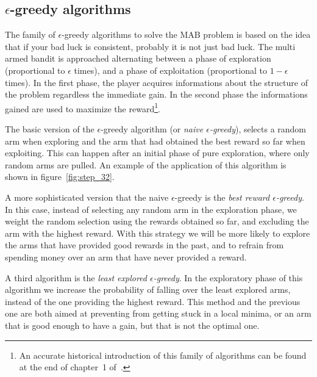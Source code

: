 \documentclass[]{scrartcl}
\theoremstyle{definition}
\begin{document}
\subsection*{$\epsilon$-greedy algorithms}

The family of $\epsilon$-greedy algorithms to solve the MAB problem is based on the idea that if your bad luck is consistent, probably it is not just bad luck. The multi armed bandit is approached alternating between a phase of exploration (proportional to $\epsilon$ times), and a phase of exploitation (proportional to $1 - \epsilon$ times). In the first phase, the player acquires informations about the structure of the problem regardless the immediate gain. In the second phase the informations gained are used to maximize the reward\footnote{
    An accurate historical introduction of this family of algorithms can be found at the end of chapter~1 of~\cite{sutton2018reinforcement}.
}.

The basic version of the $\epsilon$-greedy algorithm (or \emph{naive $\epsilon$-greedy}), selects a random arm when exploring and the arm that had obtained the best reward so far when exploiting. This can happen after an initial phase of pure exploration, where only random arms are pulled. An example of the application of this algorithm is shown in figure~\ref{fig:step_32}.

A more sophisticated version that the naive $\epsilon$-greedy is the \emph{best reward $\epsilon$-greedy}. In this case, instead of selecting any random arm in the exploration phase, we weight the random selection using the rewards obtained so far, and excluding the arm with the highest reward. With this strategy we will be more likely to explore the arms that have provided good rewards in the past, and to refrain from spending money over an arm that have never provided a reward.

A third algorithm is the \emph{least explored $\epsilon$-greedy}. In the exploratory phase of this algorithm we increase the probability of falling over the least explored arms, instead of the one providing the highest reward. This method and the previous one are both aimed at preventing from getting stuck in a local minima, or an arm that is good enough to have a gain, but that is not the optimal one.
\end{document}
